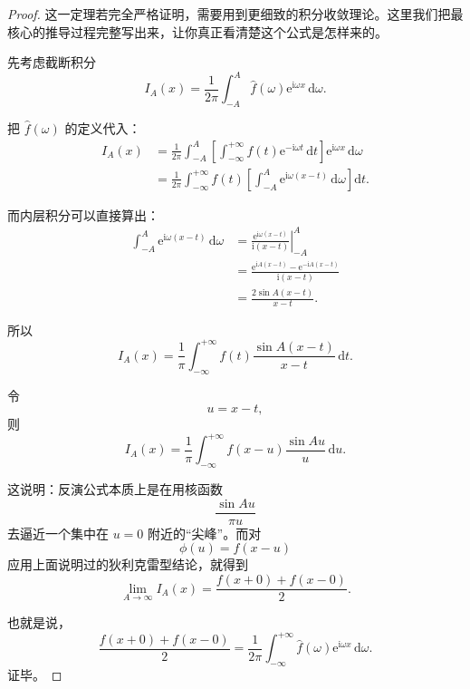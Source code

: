 \begin{proof}
这一定理若完全严格证明，需要用到更细致的积分收敛理论。这里我们把最核心的推导过程完整写出来，让你真正看清楚这个公式是怎样来的。

先考虑截断积分
\begin{equation}
    I_A(x)=\frac{1}{2\pi}\int_{-A}^{A}\hat{f}(\omega)\mathrm{e}^{\mathrm{i}\omega x}\,\mathrm{d}\omega.
\end{equation}

把 $\hat{f}(\omega)$ 的定义代入：
\begin{align}
    I_A(x)
    &=
    \frac{1}{2\pi}\int_{-A}^{A}
    \left[
        \int_{-\infty}^{+\infty}
        f(t)\mathrm{e}^{-\mathrm{i}\omega t}\,\mathrm{d}t
    \right]
    \mathrm{e}^{\mathrm{i}\omega x}\,\mathrm{d}\omega \\
    &=
    \frac{1}{2\pi}\int_{-\infty}^{+\infty}
    f(t)
    \left[
        \int_{-A}^{A}\mathrm{e}^{\mathrm{i}\omega(x-t)}\,\mathrm{d}\omega
    \right]
    \mathrm{d}t.
\end{align}

而内层积分可以直接算出：
\begin{align}
    \int_{-A}^{A}\mathrm{e}^{\mathrm{i}\omega(x-t)}\,\mathrm{d}\omega
    &=
    \left.
        \frac{\mathrm{e}^{\mathrm{i}\omega(x-t)}}{\mathrm{i}(x-t)}
    \right|_{-A}^{A} \\
    &=
    \frac{\mathrm{e}^{\mathrm{i}A(x-t)}-\mathrm{e}^{-\mathrm{i}A(x-t)}}{\mathrm{i}(x-t)} \\
    &=
    \frac{2\sin A(x-t)}{x-t}.
\end{align}

所以
\begin{equation}
    I_A(x)
    =
    \frac{1}{\pi}\int_{-\infty}^{+\infty}
    f(t)\frac{\sin A(x-t)}{x-t}\,\mathrm{d}t.
\end{equation}

令
\begin{equation}
    u=x-t,
\end{equation}
则
\begin{equation}
    I_A(x)
    =
    \frac{1}{\pi}\int_{-\infty}^{+\infty}
    f(x-u)\frac{\sin Au}{u}\,\mathrm{d}u.
\end{equation}

这说明：反演公式本质上是在用核函数
\[
    \frac{\sin Au}{\pi u}
\]
去逼近一个集中在 $u=0$ 附近的``尖峰''。而对
\[
    \phi(u)=f(x-u)
\]
应用上面说明过的狄利克雷型结论，就得到
\begin{equation}
    \lim_{A\to\infty} I_A(x)
    =
    \frac{f(x+0)+f(x-0)}{2}.
\end{equation}

也就是说，
\begin{equation}
    \frac{f(x+0)+f(x-0)}{2}
    =
    \frac{1}{2\pi}\int_{-\infty}^{+\infty}\hat{f}(\omega)\mathrm{e}^{\mathrm{i}\omega x}\,\mathrm{d}\omega.
\end{equation}
证毕。
\end{proof}

